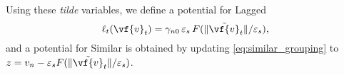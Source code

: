 Using these \emph{tilde} variables, we define a potential for Lagged
\begin{equation*}
    \ell_t(\vf{v}_t) = \gamma_{n0}\,\varepsilon_s\,F(\Vert\tilde{\vf{v}}_t\Vert/\varepsilon_s),
\end{equation*}
and a potential for Similar is obtained by updating \eqref{eq:similar_grouping}
to $z=v_n-\varepsilon_sF(\Vert\tilde{\vf{v}}_t\Vert/\varepsilon_s)$.
